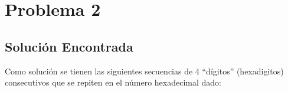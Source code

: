 \documentclass[12pt]{article}
\begin{document}

\newpage

\section{Problema 2}

\subsection{Solución Encontrada}

Como solución se tienen las siguientes secuencias de 4 “dígitos” (hexadigitos) consecutivos que se repiten en el número hexadecimal dado:
\end{document}
